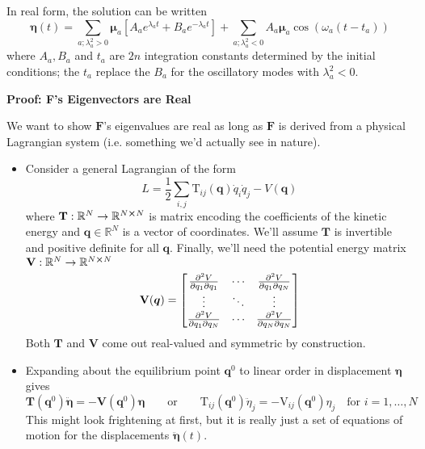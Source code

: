 \documentclass[11pt, a4paper]{article}
\newcommand{\eqtext}[1]{\qquad \text{#1} \qquad}
\newcommand{\R}{\mathbb{R}} %
\newcommand{\bddot}[1]{\ddot{\bm{#1}}}
\newcommand{\mat}[1]{\mathbf{#1}}
\begin{document}
\begin{itemize}
	In real form, the solution can be written
	\begin{equation*}
		\bm{\eta}(t) = \sum_{a; \lambda_{a}^{2} > 0} \bm{\mu}_{a} \left[A_a e^{\lambda_a t} + B_a e^{ -\lambda_a t}\right] + \sum_{a; \lambda_{a}^{2} < 0}  A_a \bm{\mu}_{a} \cos (\omega_a (t - t_a))
	\end{equation*}
	where $ A_a, B_a $ and $ t_{a} $ are $ 2n $ integration constants determined by the initial conditions; the $ t_{a} $ replace the $ B_{a} $ for the oscillatory modes with $ \lambda_{a}^{2} < 0 $.
\end{itemize}
\textbf{Proof: F's Eigenvectors are Real}
\smallskip 

We want to show $ \mat{F} $'s eigenvalues are real as long as $ \mat{F} $ is derived from a physical Lagrangian system (i.e. something we'd actually see in nature).
\begin{itemize}
	\item Consider a general Lagrangian of the form
	\begin{equation*}
		L = \frac{1}{2}\sum_{i, j} \mathrm{T}_{ij}(\bm{q}) \dot{q}_i \dot{q}_j - V(\bm{q})
	\end{equation*}
	where $ \mat{T}: \R^{N} \to \R^{N \cross N} $ is matrix encoding the coefficients of the kinetic energy and $ \bm{q} \in \R^{N} $ is a vector of coordinates. We'll assume $ \mat{T} $ is invertible and positive definite for all $ \bm{q} $. Finally, we'll need the potential energy matrix $ \mat{V}: \R^{N} \to \R^{N \cross N} $
	\begin{equation*}
		\mat{V}(\bm{q}) =
		\begin{bmatrix}
			\pdv{V}{q_1}{q_{1}} & \cdots & \pdv{V}{q_{1}}{q_N}\\
			\vdots & \ddots & \vdots\\
			\pdv{V}{q_1}{q_{N}} & \cdots & \pdv{V}{q_N}{q_{N}}\\
		\end{bmatrix}
	\end{equation*}
	Both $ \mat{T} $ and $ \mat{V} $ come out real-valued and symmetric by construction.
	
	\item Expanding about the equilibrium point $ \bm{q}^{0} $ to linear order in displacement $ \bm{\eta} $ gives
	\begin{equation*}
		\mat{T}(\bm{q}^{0}) \bddot{\eta} = -\mat{V}(\bm{q}^{0}) \bm{\eta} \eqtext{or} \mathrm{T}_{ij}(\bm{q}^{0}) \ddot{\eta}_{j} = - \mathrm{V}_{ij}(\bm{q}^{0}) \eta_{j} \quad \text{for } i = 1, \ldots, N
	\end{equation*}
	This might look frightening at first, but it is really just a set of equations of motion for the displacements $ \bddot{\eta}(t) $.
	

\end{itemize}
\end{document}

